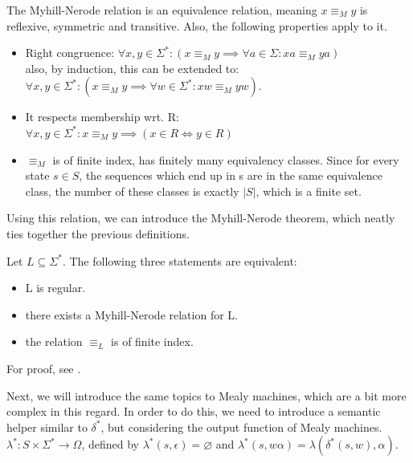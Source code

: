 The Myhill-Nerode relation is an equivalence relation, meaning $x\equiv_M y$ is reflexive, symmetric and transitive. Also, the following properties apply to it\cite{Kozen1977}.


\begin{itemize}
	\item Right congruence: $\forall x, y\in\Sigma^*: (x\equiv_M y \implies 		\forall a\in\Sigma: xa\equiv_Mya)$\\ also, by induction, this can be extended to:\\
	$\forall x, y\in\Sigma^*: (x\equiv_M y \implies \forall w\in\Sigma^*: xw\equiv_Myw)$. 
	\item It respects membership wrt. R:\\
	$\forall x, y\in\Sigma^*: x\equiv_M y \implies (x\in R \iff y\in R)$
	\item $\equiv_M$ is of finite index, has finitely many equivalency classes. Since for every state $s\in S$, the sequences which end up in s are in the same equivalence class, the number of these classes is exactly $|S|$, which is a finite set.
\end{itemize}

Using this relation, we can introduce the Myhill-Nerode theorem, which neatly ties together the previous definitions.

\begin{theorem}
	Let $L\subseteq\Sigma^*$. The following three statements are equivalent:
	\begin{itemize}
		\item L is regular.
		\item there exists a Myhill-Nerode relation for L.
		\item the relation $\equiv_L$ is of finite index.
	\end{itemize}
	For proof, see \cite{Kozen1977}\cite{10.2307/2033204}.
\end{theorem}

Next, we will introduce the same topics to Mealy machines, which are a bit more complex in this regard. In order to do this, we need to introduce a semantic helper similar to $\delta^*$, but considering the output function of Mealy machines. $\lambda^*: S\times\Sigma^* \to \Omega$, defined by $\lambda^*(s, \epsilon) = \varnothing$ and $\lambda^*(s, w\alpha) = \lambda(\delta^*(s, w), \alpha)$.



